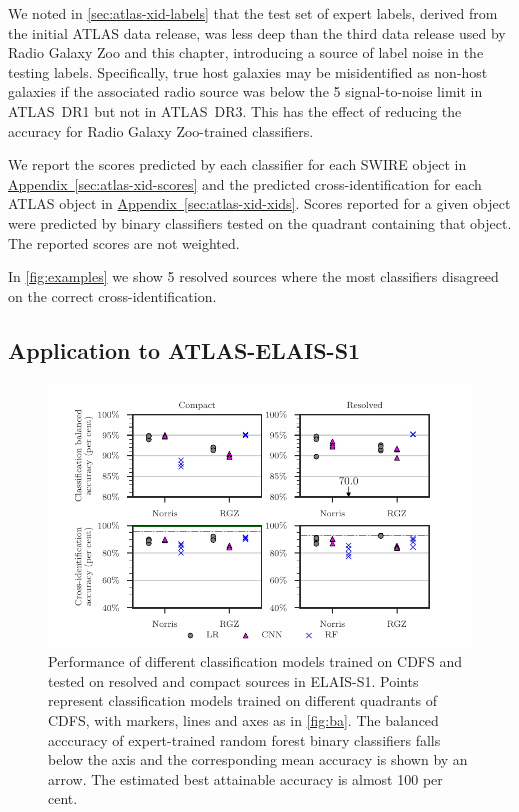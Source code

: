 \documentclass[11pt, a4paper]{book}
\newcommand{\aref}[1]{\hyperref[#1]{Appendix~\ref{#1}}}
\begin{document}
    We noted in \autoref{sec:atlas-xid-labels} that the test set of expert labels,
    derived from the initial ATLAS data release, was less deep than the third
    data release used by Radio Galaxy Zoo and this chapter, introducing a source
    of label noise in the testing labels. Specifically, true host galaxies may
    be misidentified as non-host galaxies if the associated radio source was
    below the 5 signal-to-noise limit in ATLAS~DR1 but not in ATLAS~DR3. This
    has the effect of reducing the accuracy for Radio Galaxy Zoo-trained
    classifiers.

    {We report the scores predicted by each classifier for each
    SWIRE object in \aref{sec:atlas-xid-scores} and the predicted
    cross-identification for each ATLAS object in \aref{sec:atlas-xid-xids}.
    Scores reported for a given object were predicted by binary
    classifiers tested on the quadrant containing that object. The reported scores are not weighted.}

    In \autoref{fig:examples} we show 5 resolved sources where the most classifiers disagreed on the correct cross-identification.

\subsection{Application to ATLAS-ELAIS-S1}
  \label{sec:atlas-xid-elais}

  \begin{figure}
  \centering
  \includegraphics[]{atlas-images/elais-grid-new.pdf}
  \caption[Performance of different classification models on the binary classification task, tested on ELAIS-S1.]{Performance of different classification models trained on CDFS and tested on
  resolved and compact sources in ELAIS-S1. Points represent classification models
  trained on different quadrants of CDFS, with markers, lines and axes as in
  \autoref{fig:ba}. The balanced acccuracy of expert-trained random forest
  binary classifiers falls below the axis and the corresponding mean accuracy is
  shown by an arrow. The estimated best attainable accuracy is almost 100 per cent.
    \label{fig:elais-ba}}
  \end{figure}
\end{document}
